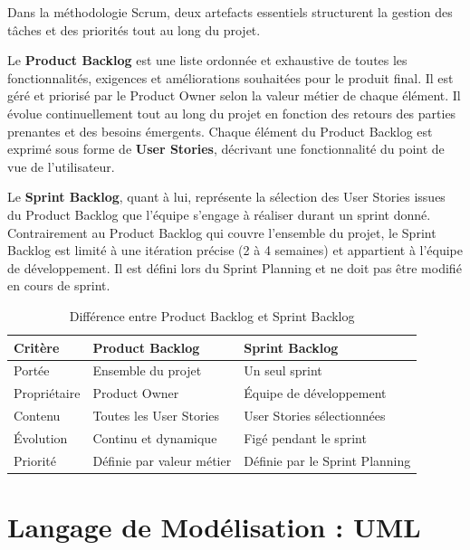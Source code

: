 Dans la méthodologie Scrum, deux artefacts essentiels structurent la gestion des tâches 
et des priorités tout au long du projet.

Le \textbf{Product Backlog} est une liste ordonnée et exhaustive de toutes les 
fonctionnalités, exigences et améliorations souhaitées pour le produit final. Il est 
géré et priorisé par le Product Owner selon la valeur métier de chaque élément. Il 
évolue continuellement tout au long du projet en fonction des retours des parties prenantes 
et des besoins émergents. Chaque élément du Product Backlog est exprimé sous forme de 
\textbf{User Stories}, décrivant une fonctionnalité du point de vue de l'utilisateur.

Le \textbf{Sprint Backlog}, quant à lui, représente la sélection des User Stories issues 
du Product Backlog que l'équipe s'engage à réaliser durant un sprint donné. Contrairement 
au Product Backlog qui couvre l'ensemble du projet, le Sprint Backlog est limité à une 
itération précise (2 à 4 semaines) et appartient à l'équipe de développement. Il est 
défini lors du Sprint Planning et ne doit pas être modifié en cours de sprint.

\begin{table}[H]
\centering
\caption{Différence entre Product Backlog et Sprint Backlog}
\label{tab:backlogs}
\begin{tabular}{|p{3.5cm}|p{5cm}|p{5cm}|}
\hline
\textbf{Critère} & \textbf{Product Backlog} & \textbf{Sprint Backlog} \\
\hline
Portée & Ensemble du projet & Un seul sprint \\
\hline
Propriétaire & Product Owner & Équipe de développement \\
\hline
Contenu & Toutes les User Stories & User Stories sélectionnées \\
\hline
Évolution & Continu et dynamique & Figé pendant le sprint \\
\hline
Priorité & Définie par valeur métier & Définie par le Sprint Planning \\
\hline
\end{tabular}
\end{table}

\section{Langage de Modélisation : UML}
\label{sec:uml}

